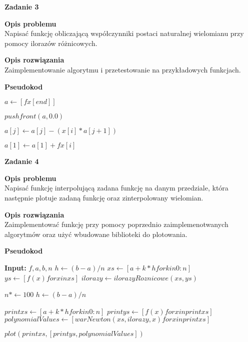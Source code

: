 \documentclass{article}
\begin{document}
\pagebreak

\noindent \textbf{\large Zadanie 3}

\noindent \textbf{Opis problemu} \\
Napisać funkcję obliczającą współczynniki postaci naturalnej wielomianu
przy pomocy ilorazów różnicowych.

\noindent \textbf{Opis rozwiązania} \\
Zaimplementowanie algorytmu i przetestowanie na przykładowych funkcjach.

\noindent \textbf{Pseudokod}
\begin{algorithmic}
	\State $a \gets [fx[end]]$


	\State $pushfront(a, 0.0)$


	\State $a[j] \gets a[j] - (x[i] * a[j+1])$

	\EndFor
	\State $a[1] \gets a[1] + fx[i]$

	\EndFor

	\State {}
\end{algorithmic}

\noindent \textbf{\large Zadanie 4}

\noindent \textbf{Opis problemu} \\
Napisać funkcję interpolującą zadana funkcję na danym przedziale,
która następnie plotuje zadaną funkcję oraz zinterpolowany wielomian.

\noindent \textbf{Opis rozwiązania} \\
Zaimplementować funkcję przy pomocy poprzednio zaimplemenotwanych algorytmów
oraz użyć wbudowane biblioteki do plotowania.

\noindent \textbf{Pseudokod}
\begin{algorithmic}
	\State \textbf{Input:} $f, a, b, n$
    \State $h \gets (b - a) / n$
    \State $xs \gets [a + k * h for k in 0:n]$
    \State $ys \gets [f(x) for x in xs]$
    \State $ilorazy \gets ilorazyRoznicowe(xs, ys)$

    \State $n *\gets 100$
    \State $h \gets (b - a) / n$

    \State $printxs \gets [a + k * h for k in 0:n]$
    \State $printys \gets [f(x) for x in printxs]$
    \State $polynomialValues \gets [warNewton(xs, ilorazy, x) for x in printxs]$

    \State $plot(printxs, [printys, polynomialValues])$
\end{algorithmic}
\end{document}
